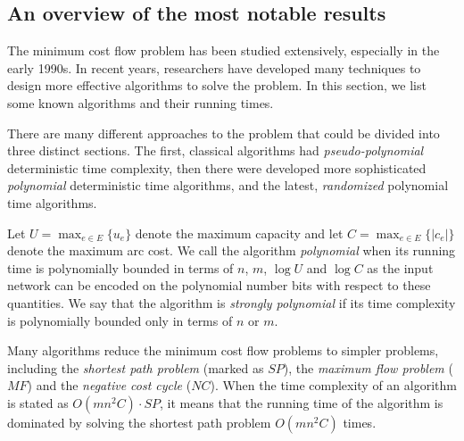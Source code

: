 \begin{center}

\end{center}


\subsection{An overview of the most notable results}
The minimum cost flow problem has been studied extensively, especially in the early 1990s. In recent years, researchers have developed many techniques to design more effective algorithms to solve the problem. In this section, we list some known algorithms and their running times.

There are many different approaches to the problem that could be divided into three distinct sections. The first, classical algorithms had \textit{pseudo-polynomial} deterministic time complexity, then there were developed more sophisticated \textit{polynomial} deterministic time algorithms, and the latest, \textit{randomized} polynomial time algorithms.

Let $U = \max_{e\in E} \{ u_e\}$ denote the maximum capacity and let $C = \max_{e \in E} \{|c_e| \}$ denote the maximum arc cost. We call the algorithm \textit{polynomial} when its running time is polynomially bounded in terms of $n$, $m$, $\log U$ and $\log C$ as the input network can be encoded on the polynomial number bits with respect to these quantities. We say that the algorithm is \textit{strongly polynomial} if its time complexity is polynomially bounded only in terms of $n$ or $m$.

Many algorithms reduce the minimum cost flow problems to simpler problems, including the \textit{shortest path problem} (marked as $SP$), the \textit{maximum flow problem} ($MF$) and the \textit{negative cost cycle} ($NC$). When the time complexity of an algorithm is stated as $O(mn^2C) \cdot SP$, it means that the running time of the algorithm is dominated by solving the shortest path problem $O(mn^2 C)$ times. 

